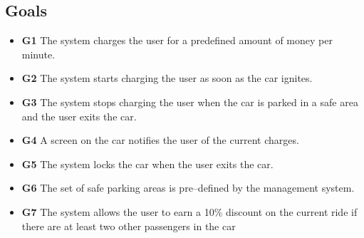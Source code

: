 \documentclass{article}
\begin{document}
		\subsection{Goals}
			\begin{itemize}

				\item \textbf{G1} The system charges the user for a predefined amount of money per minute.
				\item \textbf{G2} The system starts charging the user as soon as the car ignites.
				\item \textbf{G3} The system stops charging the user when the car is parked in a safe area and the user exits the car. %
				\item \textbf{G4} A screen on the car notifies the user of the current charges.
				\item \textbf{G5} The system locks the car when the user exits the car. %
				\item \textbf{G6} The set of safe parking areas is pre–defined by the management system.
				\item \textbf{G7} The system allows the user to earn a 10\% discount on the current ride if there are at least two other passengers in the car %

			\end{itemize}

	\newpage
	\begin{appendix}
		\listoffigures
		\listoftables
	\end{appendix}
\end{document}
